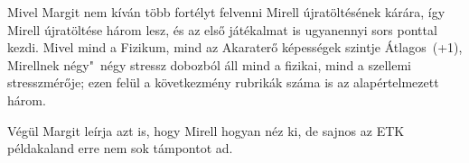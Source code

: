 
Mivel Margit nem kíván több fortélyt felvenni Mirell újratöltésének kárára, így Mirell újratöltése három lesz, és az első játékalmat is ugyanennyi sors ponttal kezdi. Mivel mind a Fizikum, mind az Akaraterő képességek szintje Átlagos~(+1), Mirellnek négy"~négy stressz dobozból áll mind a fizikai, mind a szellemi stresszmérője; ezen felül a következmény rubrikák száma is az alapértelmezett három.

Végül Margit leírja azt is, hogy Mirell hogyan néz ki, de sajnos az ETK példakaland erre nem sok támpontot ad.
